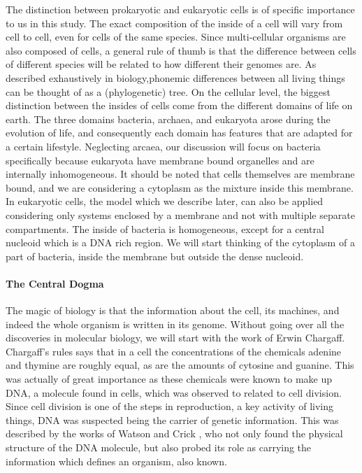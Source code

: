 \documentclass[a4paper,11pt,oneside]{book}
\begin{document}
The distinction between prokaryotic and eukaryotic cells is of specific importance to us in this study. The exact composition of the inside of a cell will vary from cell to cell, even for cells of the same species. Since multi-cellular organisms are also composed of cells, a general rule of thumb is that the difference between cells of different species will be related to how different their genomes are. As described exhaustively in biology,phonemic differences between all living things can be thought of as a (phylogenetic) tree. On the cellular level, the biggest distinction between the insides of cells come from the different domains of life on earth. The three domains bacteria, archaea, and eukaryota arose during the evolution of life, and consequently each domain has features that are adapted for a certain lifestyle. Neglecting arcaea, our discussion will focus on bacteria specifically because eukaryota have membrane bound organelles and are internally inhomogeneous. It should be noted that cells themselves are membrane bound, and we are considering a cytoplasm as the mixture inside this membrane. In eukaryotic cells, the model which we describe later, can also be applied considering only systems enclosed by a membrane and not with multiple separate compartments. The inside of bacteria is homogeneous, except for a central nucleoid which is a DNA rich region. We will start thinking of the cytoplasm of a part of bacteria, inside the membrane but outside the dense nucleoid.

\paragraph{The Central Dogma}

The magic of biology is that the information about the cell, its machines, and indeed the whole organism is written in its genome. Without going over all the discoveries in molecular biology, we will start with the work of Erwin Chargaff. Chargaff's rules says that in a cell the concentrations of the chemicals adenine and thymine are roughly equal, as are the amounts of cytosine and guanine. This was actually of great importance as these chemicals were known to make up DNA, a molecule found in cells, which was observed to related to cell division. Since cell division is one of the steps in reproduction, a key activity of living things, DNA was suspected being the carrier of genetic information. This was described by the works of Watson and Crick , who not only found the physical structure of the DNA molecule, but also probed its role as carrying the information which defines an organism, also known.
\end{document}
